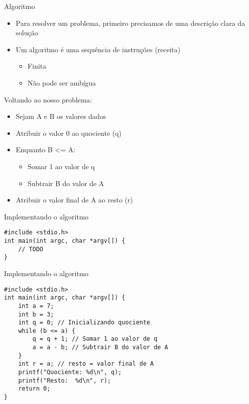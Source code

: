 \documentclass[t, aspectratio=169]{beamer}
\begin{document}
\begin{frame}[label={sec:orga0dbc4e}]{Algoritmo}
\begin{itemize}
\item Para resolver um problema, primeiro precisamos de uma descrição clara da solução
\item Um algoritmo é uma sequência de instruções (receita)
\begin{itemize}
\item Finita
\item Não pode ser ambígua
\end{itemize}
\end{itemize}

\alert{Voltando ao nosso problema:}

\begin{itemize}
\item Sejam A e B os valores dados
\item Atribuir o valor 0 ao quociente (q)
\item Enquanto \alert{B <= A}:
\begin{itemize}
\item Somar 1 ao valor de q
\item Subtrair B do valor de A
\end{itemize}
\item Atribuir o valor final de A ao resto (r)
\end{itemize}
\end{frame}

\begin{frame}[label={sec:org8ee3060},fragile]{Implementando o algoritmo}
 \vspace{-2em}
\begin{verbatim}
#include <stdio.h>
int main(int argc, char *argv[]) {
    // TODO
}
\end{verbatim}
\end{frame}

\begin{frame}[label={sec:orgfd0cadc},fragile]{Implementando o algoritmo}
 \vspace{-2em}
\begin{verbatim}
#include <stdio.h>
int main(int argc, char *argv[]) {
    int a = 7;
    int b = 3;
    int q = 0; // Inicializando quociente
    while (b <= a) {
        q = q + 1; // Somar 1 ao valor de q
        a = a - b; // Subtrair B do valor de A
    }
    int r = a; // resto = valor final de A
    printf("Quociente: %d\n", q);
    printf("Resto:  %d\n", r);
    return 0;
}
\end{verbatim}
\end{frame}
\end{document}
